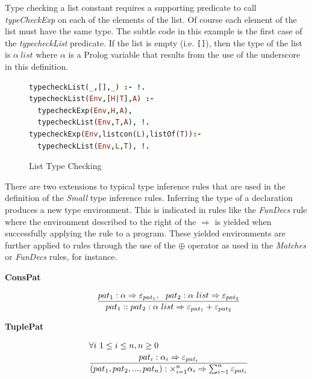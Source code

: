\documentclass[10pt]{luthercs}
\begin{document}
Type checking a list constant requires a supporting predicate to call {\em typeCheckExp} on each of the elements of the list. Of course each element of the list must have the same type. The subtle code in this example is the first case of the {\em typecheckList} predicate. If the list is empty (i.e. \verb+[]+), then the type of the list is $\alpha~list$ where $\alpha$ is a Prolog variable that results from the use of the underscore in this definition. 

\begin{figure}[htbp]
\begin{lstlisting}[language=Prolog]
typecheckList(_,[],_) :- !.
typecheckList(Env,[H|T],A) :- 
  typecheckExp(Env,H,A), 
  typecheckList(Env,T,A), !.
typecheckExp(Env,listcon(L),listOf(T)):- 
  typecheckList(Env,L,T), !.
\end{lstlisting}
\caption{List Type Checking}
\label{listcon}
\end{figure}

There are two extensions to typical type inference rules that are used in the definition of the {\em Small} type inference rules. Inferring the type of a declaration produces a new type environment. This is indicated in rules like the {\em FunDecs} rule where the environment described to the right of the $\Rightarrow$ is yielded when successfully applying the rule to a program. These yielded environments are further applied to rules through the use of the $\oplus$ operator as used in the {\em Matches} or {\em FunDecs} rules, for instance. 

\begin{description}
\item[{\textbf{ConsPat}}] \begin{gather}
\begin{split}\frac{pat_1:\alpha\Rightarrow  \varepsilon_{pat_1},~~pat_2:\alpha~list\Rightarrow \varepsilon_{pat_2}}
     {pat_1::pat_2 : \alpha~list\Rightarrow \varepsilon_{pat_1}+\varepsilon_{pat_2}}\end{split}\notag
\end{gather}
\end{description}


\begin{description}
\item[{\textbf{TuplePat}}] \begin{gather}
\begin{split}&  \forall i~1 \leq i \leq n, n \geq 0\\
& \frac{pat_i : \alpha_i \Rightarrow \varepsilon_{pat_i}}
       {(pat_1,pat_2,...,pat_n): \times_{i=1}^{n}\alpha_i\Rightarrow \sum^{n}_{i=1}\varepsilon_{pat_i}}\end{split}\notag
\end{gather}
\end{description}
\end{document}
